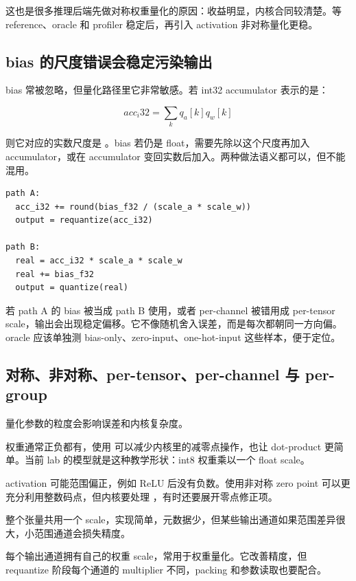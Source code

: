这也是很多推理后端先做对称权重量化的原因：收益明显，内核合同较清楚。等 reference、oracle 和 profiler 稳定后，再引入 activation 非对称量化更稳。

\subsection{bias 的尺度错误会稳定污染输出}

bias 常被忽略，但量化路径里它非常敏感。若 int32 accumulator 表示的是：

\[
acc_i32 = \sum_k q_a[k]q_w[k]
\]

则它对应的实数尺度是 。bias 若仍是 float，需要先除以这个尺度再加入 accumulator，或在 accumulator 变回实数后加入。两种做法语义都可以，但不能混用。

\begin{lstlisting}[numbers=none,caption={两种 bias 路径不能混用}]
path A:
  acc_i32 += round(bias_f32 / (scale_a * scale_w))
  output = requantize(acc_i32)

path B:
  real = acc_i32 * scale_a * scale_w
  real += bias_f32
  output = quantize(real)
\end{lstlisting}

若 path A 的 bias 被当成 path B 使用，或者 per-channel  被错用成 per-tensor scale，输出会出现稳定偏移。它不像随机舍入误差，而是每次都朝同一方向偏。oracle 应该单独测 bias-only、zero-input、one-hot-input 这些样本，便于定位。

\subsection{对称、非对称、per-tensor、per-channel 与 per-group}

量化参数的粒度会影响误差和内核复杂度。

 权重通常正负都有，使用  可以减少内核里的减零点操作，也让 dot-product 更简单。当前 lab 的模型就是这种教学形状：int8 权重乘以一个 float scale。

 activation 可能范围偏正，例如 ReLU 后没有负数。使用非对称 zero point 可以更充分利用整数码点，但内核要处理 ，有时还要展开零点修正项。

 整个张量共用一个 scale，实现简单，元数据少，但某些输出通道如果范围差异很大，小范围通道会损失精度。

 每个输出通道拥有自己的权重 scale，常用于权重量化。它改善精度，但 requantize 阶段每个通道的 multiplier 不同，packing 和参数读取也要配合。


